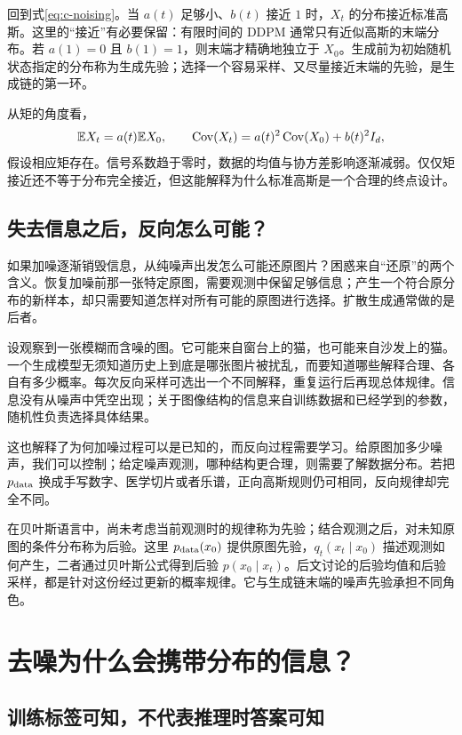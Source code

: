 回到式\eqref{eq:c-noising}。当 $a(t)$ 足够小、$b(t)$ 接近 $1$ 时，$X_t$ 的分布接近标准高斯。这里的“接近”有必要保留：有限时间的 DDPM 通常只有近似高斯的末端分布。若 $a(1)=0$ 且 $b(1)=1$，则末端才精确地独立于 $X_0$。生成前为初始随机状态指定的分布称为生成先验；选择一个容易采样、又尽量接近末端的先验，是生成链的第一环。

从矩的角度看，
\[
 \mathbb{E} X_t=a(t)\mathbb{E} X_0,\qquad
 \operatorname{Cov}(X_t)
 =a(t)^2\operatorname{Cov}(X_0)+b(t)^2I_d,
\]
假设相应矩存在。信号系数趋于零时，数据的均值与协方差影响逐渐减弱。仅仅矩接近还不等于分布完全接近，但这能解释为什么标准高斯是一个合理的终点设计。

\subsection{失去信息之后，反向怎么可能？}

如果加噪逐渐销毁信息，从纯噪声出发怎么可能还原图片？困惑来自“还原”的两个含义。恢复加噪前那一张特定原图，需要观测中保留足够信息；产生一个符合原分布的新样本，却只需要知道怎样对所有可能的原图进行选择。扩散生成通常做的是后者。

设观察到一张模糊而含噪的图。它可能来自窗台上的猫，也可能来自沙发上的猫。一个生成模型无须知道历史上到底是哪张图片被扰乱，而要知道哪些解释合理、各自有多少概率。每次反向采样可选出一个不同解释，重复运行后再现总体规律。信息没有从噪声中凭空出现；关于图像结构的信息来自训练数据和已经学到的参数，随机性负责选择具体结果。

这也解释了为何加噪过程可以是已知的，而反向过程需要学习。给原图加多少噪声，我们可以控制；给定噪声观测，哪种结构更合理，则需要了解数据分布。若把 $p_{\mathrm{data}}$ 换成手写数字、医学切片或者乐谱，正向高斯规则仍可相同，反向规律却完全不同。

在贝叶斯语言中，尚未考虑当前观测时的规律称为先验；结合观测之后，对未知原图的条件分布称为后验。这里 $p_{\mathrm{data}}(x_0)$ 提供原图先验，$q_t(x_t\mid x_0)$ 描述观测如何产生，二者通过贝叶斯公式得到后验 $p(x_0\mid x_t)$。后文讨论的后验均值和后验采样，都是针对这份经过更新的概率规律。它与生成链末端的噪声先验承担不同角色。

\section{去噪为什么会携带分布的信息？}
\label{sec:c-denoising}

\subsection{训练标签可知，不代表推理时答案可知}

